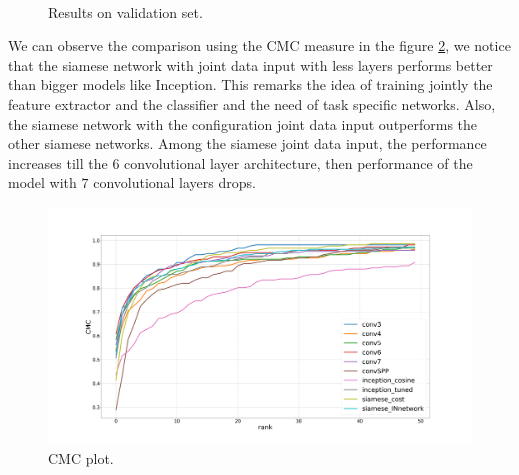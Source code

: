 \begin{figure}[H]
		
\centering

\\

\caption{Results on validation set.}
\label{lossesSiam2a}
\end{figure}



We can observe the comparison using the CMC measure in the figure \ref{lossesSiam2}, we notice that the siamese network with joint data input with less layers performs better than bigger models like Inception. This remarks the idea of training jointly the feature extractor and the classifier and the need of task specific networks. Also, the siamese network with the configuration joint data input outperforms the other siamese networks. Among the siamese joint data input, the performance increases till the $6$ convolutional layer architecture, then performance of the model with $7$ convolutional layers drops.

\begin{figure}[hptb]
\centering         
\includegraphics[width=15cm]{siameseDev/cmc2.png}
\caption{CMC plot.} \label{lossesSiam2}
\end{figure}

